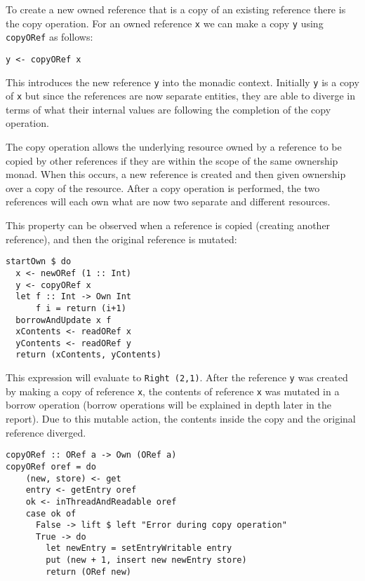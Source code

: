 \documentclass[onehalf,11pt]{beavtex}
\begin{document}
To create a new owned reference that is a copy of an existing reference
there is the copy operation. For an owned reference \texttt{x} we can make
a copy \texttt{y} using \texttt{copyORef} as follows:

\begin{verbatim}
y <- copyORef x
\end{verbatim}

This introduces the new reference \texttt{y} into the monadic context. Initially
\texttt{y} is a copy of \texttt{x} but since the references are now separate
entities, they are able to diverge in terms of what their internal
values are following the completion of the copy operation.

The copy operation allows the underlying resource owned by a reference to be
copied by other references if they are within the scope of the same ownership
monad.
When this occurs, a new reference is created and then given ownership over a
copy of the resource.
After a copy operation is performed, the two references will each own what are
now two separate and different resources.

This property can be observed when a reference is copied (creating another
reference), and then the original reference is mutated:

\begin{lstlisting}
startOwn $ do
  x <- newORef (1 :: Int)
  y <- copyORef x
  let f :: Int -> Own Int
      f i = return (i+1)
  borrowAndUpdate x f
  xContents <- readORef x
  yContents <- readORef y
  return (xContents, yContents)
\end{lstlisting}

This expression will evaluate to \texttt{Right (2,1)}.
After the reference \texttt{y} was created by making a copy of
reference \texttt{x}, the contents of reference \texttt{x}
was mutated in a borrow operation (borrow operations will be explained in depth
later in the report).
Due to this mutable action, the contents inside the copy and the original
reference diverged.

\begin{verbatim}
copyORef :: ORef a -> Own (ORef a)
copyORef oref = do
    (new, store) <- get
    entry <- getEntry oref
    ok <- inThreadAndReadable oref
    case ok of
      False -> lift $ left "Error during copy operation"
      True -> do
        let newEntry = setEntryWritable entry
        put (new + 1, insert new newEntry store)
        return (ORef new)
\end{verbatim}
\end{document}
